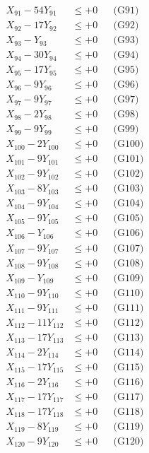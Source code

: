 \documentclass[a4paper,10pt]{article}
\begin{document}
{\begin{align}
X_{91} - 54Y_{91} &\leq +0 && \text{(G91)} \\
X_{92} - 17Y_{92} &\leq +0 && \text{(G92)} \\
X_{93} - Y_{93} &\leq +0 && \text{(G93)} \\
X_{94} - 30Y_{94} &\leq +0 && \text{(G94)} \\
X_{95} - 17Y_{95} &\leq +0 && \text{(G95)} \\
X_{96} - 9Y_{96} &\leq +0 && \text{(G96)} \\
X_{97} - 9Y_{97} &\leq +0 && \text{(G97)} \\
\allowbreak
X_{98} - 2Y_{98} &\leq +0 && \text{(G98)} \\
X_{99} - 9Y_{99} &\leq +0 && \text{(G99)} \\
X_{100} - 2Y_{100} &\leq +0 && \text{(G100)} \\
X_{101} - 9Y_{101} &\leq +0 && \text{(G101)} \\
X_{102} - 9Y_{102} &\leq +0 && \text{(G102)} \\
X_{103} - 8Y_{103} &\leq +0 && \text{(G103)} \\
X_{104} - 9Y_{104} &\leq +0 && \text{(G104)} \\
X_{105} - 9Y_{105} &\leq +0 && \text{(G105)} \\
X_{106} - Y_{106} &\leq +0 && \text{(G106)} \\
X_{107} - 9Y_{107} &\leq +0 && \text{(G107)} \\
\allowbreak
X_{108} - 9Y_{108} &\leq +0 && \text{(G108)} \\
X_{109} - Y_{109} &\leq +0 && \text{(G109)} \\
X_{110} - 9Y_{110} &\leq +0 && \text{(G110)} \\
X_{111} - 9Y_{111} &\leq +0 && \text{(G111)} \\
X_{112} - 11Y_{112} &\leq +0 && \text{(G112)} \\
X_{113} - 17Y_{113} &\leq +0 && \text{(G113)} \\
X_{114} - 2Y_{114} &\leq +0 && \text{(G114)} \\
X_{115} - 17Y_{115} &\leq +0 && \text{(G115)} \\
X_{116} - 2Y_{116} &\leq +0 && \text{(G116)} \\
X_{117} - 17Y_{117} &\leq +0 && \text{(G117)} \\
\allowbreak
X_{118} - 17Y_{118} &\leq +0 && \text{(G118)} \\
X_{119} - 8Y_{119} &\leq +0 && \text{(G119)} \\
X_{120} - 9Y_{120} &\leq +0 && \text{(G120)} \\

\end{align}}
\end{document}
